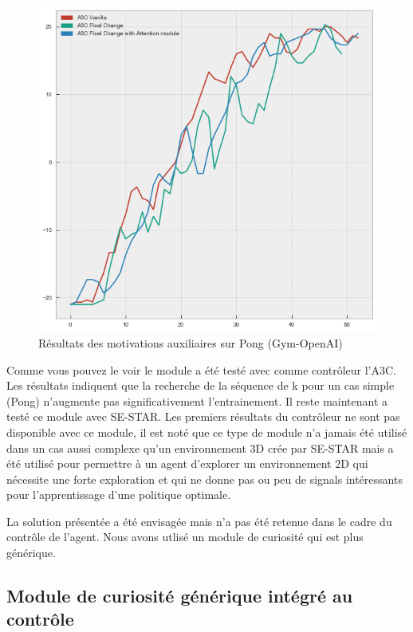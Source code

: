\begin{figure}[h!]
    \begin{center}
        \includegraphics[scale=.35]{./assets/CURIOSITY/A3C_auxiliaire.png}
        \caption{Résultats des motivations auxiliaires sur Pong (Gym-OpenAI)}
    \end{center}
\end{figure}

Comme vous pouvez le voir le module a été testé avec comme contrôleur l'A3C. Les résultats indiquent que la recherche de la séquence de k pour un cas simple (Pong) n'augmente pas significativement l'entrainement. Il reste maintenant a testé ce module avec SE-STAR. Les premiers résultats du contrôleur ne sont pas disponible avec ce module, il est noté que ce type de module n'a jamais été utilisé dans un cas aussi complexe qu'un environnement 3D crée par SE-STAR mais a été utilisé pour permettre à un agent d'explorer un environnement 2D qui nécessite une forte exploration et qui ne donne pas ou peu de signals intéressants pour l'apprentissage d'une politique optimale.

La solution présentée a été envisagée mais n'a pas été retenue dans le cadre du contrôle de l'agent. Nous avons utlisé un module de curiosité qui est plus générique.

\subsection{Module de curiosité générique intégré au contrôle}

